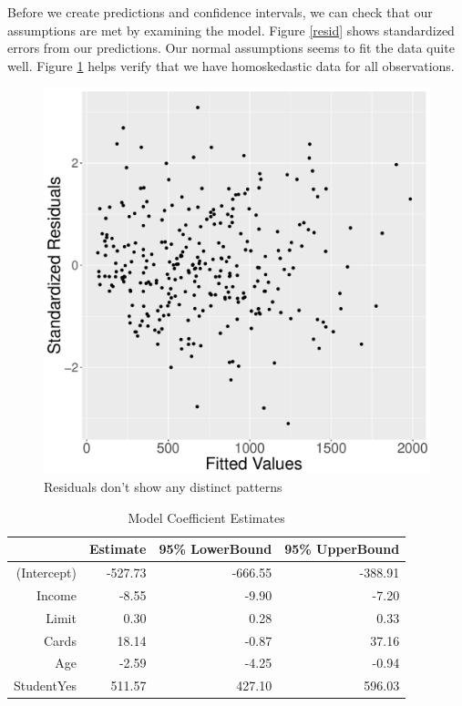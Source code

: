 \documentclass{article}
\begin{document}
Before we create predictions and confidence intervals, we can check that our assumptions are met by examining the model. Figure \ref{resid} shows standardized errors from our predictions. Our normal assumptions seems to fit the data quite well. Figure \ref{fitted} helps verify that we have homoskedastic data for all observations.  

\begin{figure}
\centering
\includegraphics[scale=.3]{fitted.pdf}
\caption{Residuals don't show any distinct patterns}
\label{fitted}
\end{figure}


\begin{table}[ht]
\centering
\begin{tabular}{rrrr}
  \hline
 & Estimate & 95\% LowerBound & 95\% UpperBound \\ 
  \hline
(Intercept) & -527.73 & -666.55 & -388.91 \\ 
  Income & -8.55 & -9.90 & -7.20 \\ 
  Limit & 0.30 & 0.28 & 0.33 \\ 
  Cards & 18.14 & -0.87 & 37.16 \\ 
  Age & -2.59 & -4.25 & -0.94 \\ 
  StudentYes & 511.57 & 427.10 & 596.03 \\ 
   \hline
\end{tabular}
\caption{Model Coefficient Estimates} 
\label{coefs}
\end{table}
\end{document}
